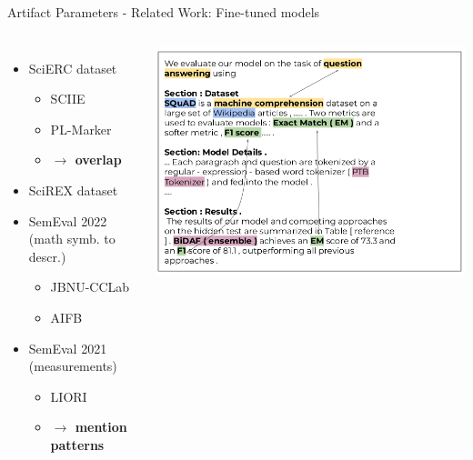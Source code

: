 \documentclass[en,16:9,smallfoot]{sdqbeamer}
\begin{document}
   \begin{frame}{Artifact Parameters - Related Work: Fine-tuned models}
   \begin{columns}
           \begin{itemize}
               \item SciERC dataset %
                   \begin{itemize}
                       \item SCIIE~\cite{luan2018scierc}
                       \item PL-Marker~\cite{Ye2022}
                       \item \textbf{$\rightarrow$ overlap}
                   \end{itemize}
               \item {\color{contextgrey}SciREX dataset} %
               \item {\color{contextgrey}SemEval 2022 (math symb. to descr.)}
                   \begin{itemize}
                       \item {\color{contextgrey}JBNU-CCLab~\cite{Lee2022}}
                       \item {\color{contextgrey}AIFB~\cite{Popovic2022}}
                   \end{itemize}
               \item SemEval 2021 (measurements)
                   \begin{itemize}
                       \item LIORI~\cite{Davletov2021}
                       \item \textbf{$\rightarrow$ mention patterns}
                   \end{itemize}
           \end{itemize}
           \begin{center}\includegraphics[width=\textwidth]{imgs/scirex}\end{center}

\end{columns}
\end{frame}
\end{document}
